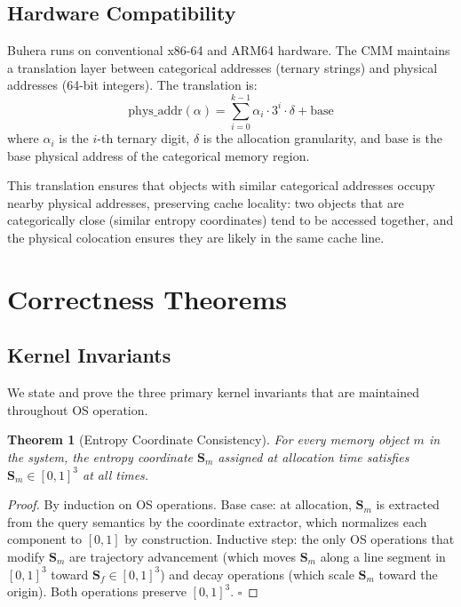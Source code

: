 \documentclass[12pt,twocolumn]{article}
\newtheorem{theorem}{Theorem}[section]
\begin{document}
\subsection{Hardware Compatibility}

Buhera runs on conventional x86-64 and ARM64 hardware. The CMM maintains a translation layer between categorical addresses (ternary strings) and physical addresses (64-bit integers). The translation is:
\begin{equation}
\text{phys\_addr}(\alpha) = \sum_{i=0}^{k-1} \alpha_i \cdot 3^i \cdot \delta + \text{base}
\end{equation}
where $\alpha_i$ is the $i$-th ternary digit, $\delta$ is the allocation granularity, and $\text{base}$ is the base physical address of the categorical memory region.

This translation ensures that objects with similar categorical addresses occupy nearby physical addresses, preserving cache locality: two objects that are categorically close (similar entropy coordinates) tend to be accessed together, and the physical colocation ensures they are likely in the same cache line.

\section{Correctness Theorems}
\label{sec:correctness}

\subsection{Kernel Invariants}

We state and prove the three primary kernel invariants that are maintained throughout OS operation.

\begin{theorem}[Entropy Coordinate Consistency]
\label{thm:coord_consistency}
For every memory object $m$ in the system, the entropy coordinate $\mathbf{S}_m$ assigned at allocation time satisfies $\mathbf{S}_m \in [0,1]^3$ at all times.
\end{theorem}

\begin{proof}
By induction on OS operations. Base case: at allocation, $\mathbf{S}_m$ is extracted from the query semantics by the coordinate extractor, which normalizes each component to $[0,1]$ by construction. Inductive step: the only OS operations that modify $\mathbf{S}_m$ are trajectory advancement (which moves $\mathbf{S}_m$ along a line segment in $[0,1]^3$ toward $\mathbf{S}_f \in [0,1]^3$) and decay operations (which scale $\mathbf{S}_m$ toward the origin). Both operations preserve $[0,1]^3$. $\square$
\end{proof}
\end{document}
